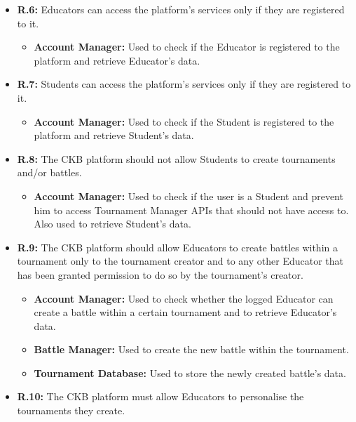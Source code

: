 \documentclass{article}
\begin{document}
{\begin{itemize}
\begin{itemize}
              registered to the platform and retrieve Educator's data.
          \end{itemize}
    \item \textbf{R.6:} Educators can access the platform's services only if they are registered to it.
          \begin{itemize}
              \item \textbf{Account Manager:} Used to check if the Educator is registered to
              the platform and retrieve Educator's data.
          \end{itemize}
    \item \textbf{R.7:} Students can access the platform's services only if they are registered to it.
          \begin{itemize}
            \item \textbf{Account Manager:} Used to check if the Student is registered to
            the platform and retrieve Student's data.
          \end{itemize}
    \item \textbf{R.8:} The CKB platform should not allow Students to create tournaments and/or battles.
          \begin{itemize}
              \item \textbf{Account Manager:} Used to check if the user is a Student and prevent him
              to access Tournament Manager APIs that should not have access to. Also used to 
              retrieve Student's data.
          \end{itemize}
    \item \textbf{R.9:} The CKB platform should allow Educators to create battles within a tournament only to the tournament
          creator and to any other Educator that has been granted permission to do so by the tournament's creator.
          \begin{itemize}
              \item \textbf{Account Manager:} Used to check whether the logged Educator can create
              a battle within a certain tournament and to retrieve Educator's data.
              \item \textbf{Battle Manager:} Used to create the new battle within the tournament.
              \item \textbf{Tournament Database:} Used to store the newly created battle's data.
          \end{itemize}
    \item \textbf{R.10:} The CKB platform must allow Educators to personalise the tournaments they create.

\end{itemize}}
\end{document}

